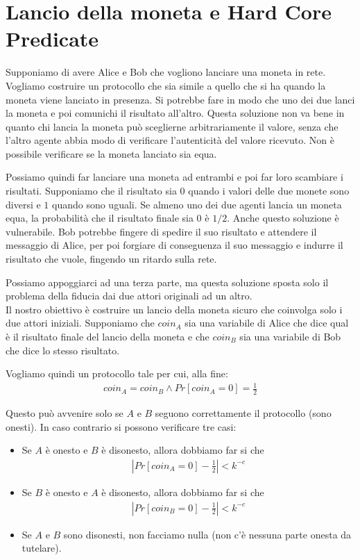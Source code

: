 \chapter{Lancio della moneta e Hard Core Predicate}
\label{chapter8}

Supponiamo di avere Alice e Bob che vogliono lanciare una moneta in rete. Vogliamo costruire un protocollo che sia simile a quello che si ha quando la moneta viene lanciato in presenza. Si potrebbe fare in modo che uno dei due lanci la moneta e poi comunichi il risultato all'altro. Questa soluzione non va bene in quanto chi lancia la moneta può sceglierne arbitrariamente il valore, senza che l'altro agente abbia modo di verificare l'autenticità del valore ricevuto. Non è possibile verificare se la moneta lanciato sia equa.

Possiamo quindi far lanciare una moneta ad entrambi e poi far loro scambiare i risultati. Supponiamo che il risultato sia $0$ quando i valori delle due monete sono diversi e $1$ quando sono uguali. Se almeno uno dei due agenti lancia un moneta equa, la probabilità che il risultato finale sia $0$ è $1/2$. Anche questo soluzione è vulnerabile. Bob potrebbe fingere di spedire il suo risultato e attendere il messaggio di Alice, per poi forgiare di conseguenza il suo messaggio e indurre il risultato che vuole, fingendo un ritardo sulla rete. 

Possiamo appoggiarci ad una terza parte, ma questa soluzione sposta solo il problema della fiducia dai due attori originali ad un altro.\\

\noindent Il nostro obiettivo è costruire un lancio della moneta sicuro che coinvolga solo i due attori iniziali. Supponiamo che $coin_A$ sia una variabile di Alice che dice qual è il risultato finale del lancio della moneta e che $coin_B$ sia una variabile di Bob che dice lo stesso risultato. 

Vogliamo quindi un protocollo tale per cui, alla fine:
\begin{align*}
    coin_A = coin_B \land Pr[coin_A = 0] = \frac{1}{2}
\end{align*}

\noindent Questo può avvenire solo se $A$ e $B$ seguono correttamente il protocollo (sono onesti). In caso contrario si possono verificare tre casi:
\begin{itemize}
    \item Se $A$ è onesto e $B$ è disonesto, allora dobbiamo far si che
    \begin{align*}
        \left| Pr[coin_A = 0] - \frac{1}{2}\right| < k^{-c}
    \end{align*}
     \item Se $B$ è onesto e $A$ è disonesto, allora dobbiamo far si che
    \begin{align*}
        \left| Pr[coin_B = 0] - \frac{1}{2}\right| < k^{-c}
    \end{align*}
    \item Se $A$ e $B$ sono disonesti, non facciamo nulla (non c'è nessuna parte onesta da tutelare).
\end{itemize}

